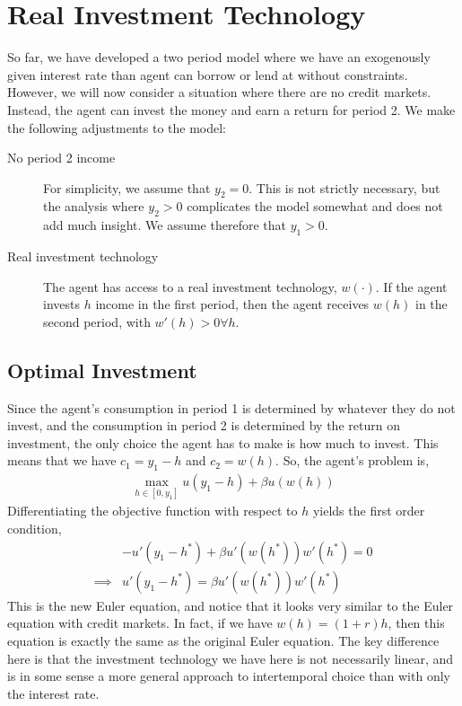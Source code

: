 \section{Real Investment Technology}
So far, we have developed a two period model where we have an exogenously given interest rate than agent can borrow or lend at without constraints. However, we will now consider a situation where there are no credit markets. Instead, the agent can invest the money and earn a return for period 2. We make the following adjustments to the model:
\begin{description}
    \item[No period 2 income] For simplicity, we assume that $y_2 = 0$. This is not strictly necessary, but the analysis where $y_2 > 0$ complicates the model somewhat and does not add much insight. We assume therefore that $y_1 > 0$.
    \item[Real investment technology] The agent has access to a real investment technology, $w(\cdot)$. If the agent invests $h$ income in the first period, then the agent receives $w(h)$ in the second period, with $w'(h) > 0 \forall h$. 
\end{description}

\subsection*{Optimal Investment}
Since the agent's consumption in period 1 is determined by whatever they do not invest, and the consumption in period 2 is determined by the return on investment, the only choice the agent has to make is how much to invest. This means that we have $c_1 = y_1 - h$ and $c_2 = w(h)$. So, the agent's problem is,
\begin{align*}
    \max_{h \in [0, y_1]} u(y_1 - h) + \beta u(w(h))
\end{align*}
Differentiating the objective function with respect to $h$ yields the first order condition, 
\begin{align*}
    &-u'(y_1 - h^*) + \beta u'(w(h^*)) w'(h^*) = 0 \\
    \implies& u'(y_1 - h^*) = \beta u'(w(h^*)) w'(h^*)
\end{align*}
This is the new Euler equation, and notice that it looks very similar to the Euler equation with credit markets. In fact, if we have $w(h) = (1 + r)h$, then this equation is exactly the same as the original Euler equation. The key difference here is that the investment technology we have here is not necessarily linear, and is in some sense a more general approach to intertemporal choice than with only the interest rate.

